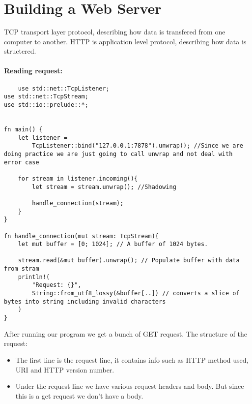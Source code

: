 \section{Building a Web Server}
\begin{definition}
    TCP transport layer protocol, describing how data is transfered from one computer to another. HTTP is application level protocol, describing how data is structered.
\end{definition}
\newpage
\paragraph*{Reading request:}\begin{lstlisting}
    use std::net::TcpListener;  
use std::net::TcpStream;
use std::io::prelude::*;


fn main() {
    let listener = 
        TcpListener::bind("127.0.0.1:7878").unwrap(); //Since we are doing practice we are just going to call unwrap and not deal with error case

    for stream in listener.incoming(){
        let stream = stream.unwrap(); //Shadowing

        handle_connection(stream);
    }
}

fn handle_connection(mut stream: TcpStream){
    let mut buffer = [0; 1024]; // A buffer of 1024 bytes.
    
    stream.read(&mut buffer).unwrap(); // Populate buffer with data from stram
    println!(
        "Request: {}", 
        String::from_utf8_lossy(&buffer[..]) // converts a slice of bytes into string including invalid characters
    )
}
\end{lstlisting}

After running our program we get a bunch of GET request. The structure of the request:\begin{itemize}
    \item The first line is the request line, it contains info such as HTTP method used, URI and HTTP version number.
    \item Under the request line we have various request headers and body. But since this is a get request we don't have a body.
\end{itemize}

